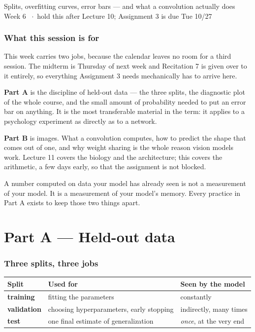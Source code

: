 \documentclass[11pt]{article}
\begin{document}
  {Splits, overfitting curves, error bars --- and what a convolution actually does}
  {Week 6 \ $\cdot$\ hold this after Lecture 10; Assignment 3 is due Tue 10/27}

\section*{What this session is for}

This week carries two jobs, because the calendar leaves no room for a third
session. The midterm is Thursday of next week and Recitation 7 is given over to
it entirely, so everything Assignment 3 needs mechanically has to arrive here.

\textbf{Part A} is the discipline of held-out data --- the three splits, the
diagnostic plot of the whole course, and the small amount of probability needed
to put an error bar on anything. It is the most transferable material in the
term: it applies to a psychology experiment as directly as to a network.

\textbf{Part B} is images. What a convolution computes, how to predict the shape
that comes out of one, and why weight sharing is the whole reason vision models
work. Lecture 11 covers the biology and the architecture; this covers the
arithmetic, a few days early, so that the assignment is not blocked.

\begin{keybox}
 A number computed on data your model has already seen is not
a measurement of your model. It is a measurement of your model's memory. Every
practice in Part A exists to keep those two things apart.
\end{keybox}

\part*{Part A --- Held-out data}

\section{Three splits, three jobs}

\begin{center}
\begin{tabular}{@{}lll@{}}
\toprule
Split & Used for & Seen by the model \\
\midrule
\textbf{training}   & fitting the parameters & constantly \\
\textbf{validation} & choosing hyperparameters, early stopping & indirectly, many times \\
\textbf{test}       & one final estimate of generalization & \emph{once}, at the very end \\
\bottomrule
\end{tabular}
\end{center}
\end{document}
